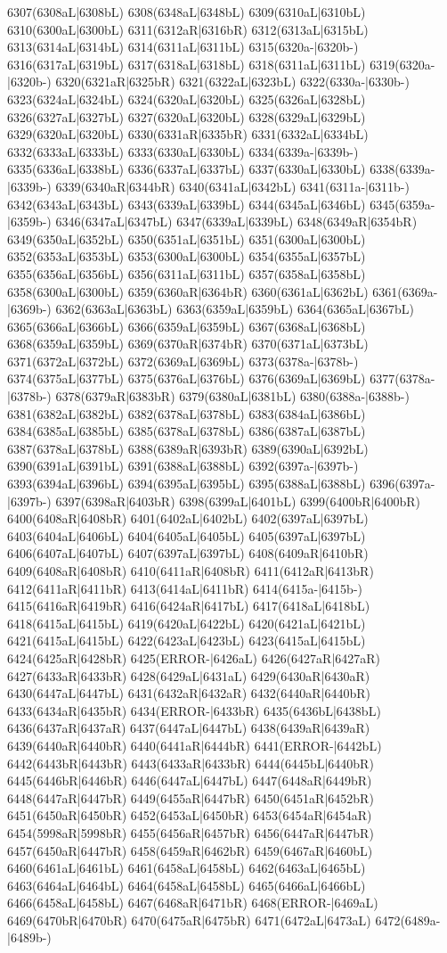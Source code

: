 6307(6308aL|6308bL) 6308(6348aL|6348bL) 6309(6310aL|6310bL) 6310(6300aL|6300bL) 6311(6312aR|6316bR) 6312(6313aL|6315bL) 6313(6314aL|6314bL) 6314(6311aL|6311bL) 6315(6320a-|6320b-) 6316(6317aL|6319bL) 6317(6318aL|6318bL) 6318(6311aL|6311bL) 6319(6320a-|6320b-) 6320(6321aR|6325bR) 6321(6322aL|6323bL) 6322(6330a-|6330b-) 6323(6324aL|6324bL) 6324(6320aL|6320bL) 6325(6326aL|6328bL) 6326(6327aL|6327bL) 6327(6320aL|6320bL) 6328(6329aL|6329bL) 6329(6320aL|6320bL) 6330(6331aR|6335bR) 6331(6332aL|6334bL) 6332(6333aL|6333bL) 6333(6330aL|6330bL) 6334(6339a-|6339b-) 6335(6336aL|6338bL) 6336(6337aL|6337bL) 6337(6330aL|6330bL) 6338(6339a-|6339b-) 6339(6340aR|6344bR) 6340(6341aL|6342bL) 6341(6311a-|6311b-) 6342(6343aL|6343bL) 6343(6339aL|6339bL) 6344(6345aL|6346bL) 6345(6359a-|6359b-) 6346(6347aL|6347bL) 6347(6339aL|6339bL) 6348(6349aR|6354bR) 6349(6350aL|6352bL) 6350(6351aL|6351bL) 6351(6300aL|6300bL) 6352(6353aL|6353bL) 6353(6300aL|6300bL) 6354(6355aL|6357bL) 6355(6356aL|6356bL) 6356(6311aL|6311bL) 6357(6358aL|6358bL) 6358(6300aL|6300bL) 6359(6360aR|6364bR) 6360(6361aL|6362bL) 6361(6369a-|6369b-) 6362(6363aL|6363bL) 6363(6359aL|6359bL) 6364(6365aL|6367bL) 6365(6366aL|6366bL) 6366(6359aL|6359bL) 6367(6368aL|6368bL) 6368(6359aL|6359bL) 6369(6370aR|6374bR) 6370(6371aL|6373bL) 6371(6372aL|6372bL) 6372(6369aL|6369bL) 6373(6378a-|6378b-) 6374(6375aL|6377bL) 6375(6376aL|6376bL) 6376(6369aL|6369bL) 6377(6378a-|6378b-) 6378(6379aR|6383bR) 6379(6380aL|6381bL) 6380(6388a-|6388b-) 6381(6382aL|6382bL) 6382(6378aL|6378bL) 6383(6384aL|6386bL) 6384(6385aL|6385bL) 6385(6378aL|6378bL) 6386(6387aL|6387bL) 6387(6378aL|6378bL) 6388(6389aR|6393bR) 6389(6390aL|6392bL) 6390(6391aL|6391bL) 6391(6388aL|6388bL) 6392(6397a-|6397b-) 6393(6394aL|6396bL) 6394(6395aL|6395bL) 6395(6388aL|6388bL) 6396(6397a-|6397b-) 6397(6398aR|6403bR) 6398(6399aL|6401bL) 6399(6400bR|6400bR) 6400(6408aR|6408bR) 6401(6402aL|6402bL) 6402(6397aL|6397bL) 6403(6404aL|6406bL) 6404(6405aL|6405bL) 6405(6397aL|6397bL) 6406(6407aL|6407bL) 6407(6397aL|6397bL) 6408(6409aR|6410bR) 6409(6408aR|6408bR) 6410(6411aR|6408bR) 6411(6412aR|6413bR) 6412(6411aR|6411bR) 6413(6414aL|6411bR) 6414(6415a-|6415b-) 6415(6416aR|6419bR) 6416(6424aR|6417bL) 6417(6418aL|6418bL) 6418(6415aL|6415bL) 6419(6420aL|6422bL) 6420(6421aL|6421bL) 6421(6415aL|6415bL) 6422(6423aL|6423bL) 6423(6415aL|6415bL) 6424(6425aR|6428bR) 6425(ERROR-|6426aL) 6426(6427aR|6427aR) 6427(6433aR|6433bR) 6428(6429aL|6431aL) 6429(6430aR|6430aR) 6430(6447aL|6447bL) 6431(6432aR|6432aR) 6432(6440aR|6440bR) 6433(6434aR|6435bR) 6434(ERROR-|6433bR) 6435(6436bL|6438bL) 6436(6437aR|6437aR) 6437(6447aL|6447bL) 6438(6439aR|6439aR) 6439(6440aR|6440bR) 6440(6441aR|6444bR) 6441(ERROR-|6442bL) 6442(6443bR|6443bR) 6443(6433aR|6433bR) 6444(6445bL|6440bR) 6445(6446bR|6446bR) 6446(6447aL|6447bL) 6447(6448aR|6449bR) 6448(6447aR|6447bR) 6449(6455aR|6447bR) 6450(6451aR|6452bR) 6451(6450aR|6450bR) 6452(6453aL|6450bR) 6453(6454aR|6454aR) 6454(5998aR|5998bR) 6455(6456aR|6457bR) 6456(6447aR|6447bR) 6457(6450aR|6447bR) 6458(6459aR|6462bR) 6459(6467aR|6460bL) 6460(6461aL|6461bL) 6461(6458aL|6458bL) 6462(6463aL|6465bL) 6463(6464aL|6464bL) 6464(6458aL|6458bL) 6465(6466aL|6466bL) 6466(6458aL|6458bL) 6467(6468aR|6471bR) 6468(ERROR-|6469aL) 6469(6470bR|6470bR) 6470(6475aR|6475bR) 6471(6472aL|6473aL) 6472(6489a-|6489b-) 